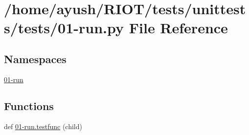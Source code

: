\hypertarget{unittests_2tests_201-run_8py}{}\section{/home/ayush/\+R\+I\+O\+T/tests/unittests/tests/01-\/run.py File Reference}
\label{unittests_2tests_201-run_8py}
\subsection*{Namespaces}
\begin{DoxyCompactItemize}
\item 
 \hyperlink{namespace01-run}{01-\/run}
\end{DoxyCompactItemize}
\subsection*{Functions}
\begin{DoxyCompactItemize}
\item 
def \hyperlink{namespace01-run_aff983ffd4ab0e6bf8e7e58970e4a10bb}{01-\/run.\+testfunc} (child)
\end{DoxyCompactItemize}
